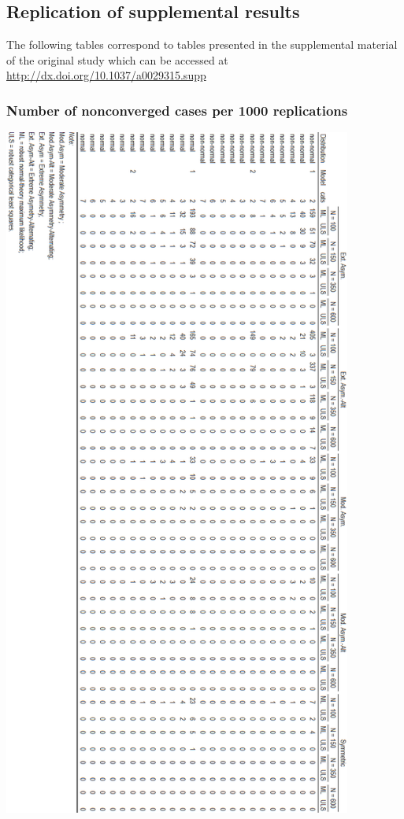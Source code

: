 \documentclass[10,a4paperpaper,]{article}
\begin{document}
\subsection{Replication of supplemental results}

The following tables correspond to tables presented in the supplemental
material of the original study which can be accessed at
\url{http://dx.doi.org/10.1037/a0029315.supp}

\subsubsection{Number of nonconverged cases per 1000 replications}

\includegraphics[width=325pt]{./figures/tabA2_A3}
\end{document}
